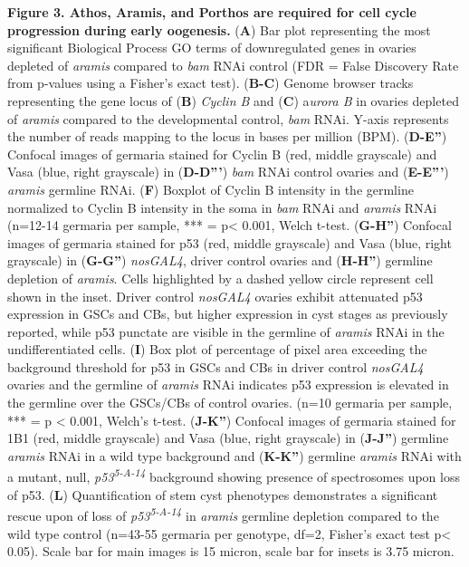 \documentclass[12pt,twoside]{reedthesis}
\begin{document}
\textbf{Figure 3. Athos, Aramis, and Porthos are required for cell cycle
progression during early oogenesis.} (\textbf{A}) Bar plot representing the
most significant Biological Process GO terms of downregulated genes in
ovaries depleted of \emph{aramis} compared to \emph{bam} RNAi control (FDR = False
Discovery Rate from p-values using a Fisher's exact test). (\textbf{B-C})
Genome browser tracks representing the gene locus of (\textbf{B}) \emph{Cyclin B}
and (\textbf{C}) a\emph{urora B} in ovaries depleted of \emph{aramis} compared to the
developmental control, \emph{bam} RNAi. Y-axis represents the number of reads
mapping to the locus in bases per million (BPM). (\textbf{D-E''}) Confocal
images of germaria stained for Cyclin B (red, middle grayscale) and Vasa
(blue, right grayscale) in (\textbf{D-D'''}) \emph{bam} RNAi control ovaries and
(\textbf{E-E'''}) \emph{aramis} germline RNAi. (\textbf{F}) Boxplot of Cyclin B
intensity in the germline normalized to Cyclin B intensity in the soma
in \emph{bam} RNAi and \emph{aramis} RNAi (n=12-14 germaria per sample, *** =
p\textless{} 0.001, Welch t-test. (\textbf{G-H''}) Confocal images of germaria stained
for p53 (red, middle grayscale) and Vasa (blue, right grayscale) in
(\textbf{G-G''}) \emph{nosGAL4}, driver control ovaries and (\textbf{H-H''}) germline
depletion of \emph{aramis}. Cells highlighted by a dashed yellow circle
represent cell shown in the inset. Driver control \emph{nosGAL4} ovaries
exhibit attenuated p53 expression in GSCs and CBs, but higher expression
in cyst stages as previously reported, while p53 punctate are visible in
the germline of \emph{aramis} RNAi in the undifferentiated cells. (\textbf{I}) Box
plot of percentage of pixel area exceeding the background threshold for
p53 in GSCs and CBs in driver control \emph{nosGAL4} ovaries and the germline
of \emph{aramis} RNAi indicates p53 expression is elevated in the germline
over the GSCs/CBs of control ovaries. (n=10 germaria per sample, ***
= p \textless{} 0.001, Welch's t-test. (\textbf{J-K''}) Confocal images of germaria
stained for 1B1 (red, middle grayscale) and Vasa (blue, right grayscale)
in (\textbf{J-J''}) germline \emph{aramis} RNAi in a wild type background and
(\textbf{K-K''}) germline \emph{aramis} RNAi with a mutant, null, \emph{p53\textsuperscript{5-A-14}}
background showing presence of spectrosomes upon loss of p53. (\textbf{L})
Quantification of stem cyst phenotypes demonstrates a significant rescue
upon of loss of \emph{p53\textsuperscript{5-A-14}} in \emph{aramis} germline depletion compared to
the wild type control (n=43-55 germaria per genotype, df=2, Fisher's
exact test p\textless{} 0.05). Scale bar for main images is 15 micron, scale bar
for insets is 3.75 micron.
\end{document}
